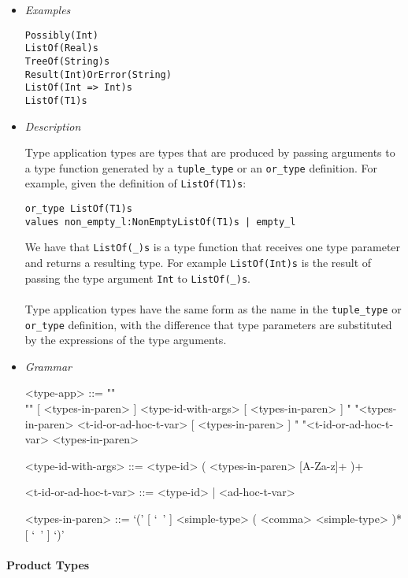 \documentclass{article}
\begin{document}
\begin{itemize}
\item \textit{Examples}
\begin{verbatim}
Possibly(Int)
ListOf(Real)s
TreeOf(String)s 
Result(Int)OrError(String)
ListOf(Int => Int)s
ListOf(T1)s
\end{verbatim}

\item \textit{Description}

Type application types are types that are produced by passing arguments
to a type function generated by a \texttt{tuple_type} or an \texttt{or_type}
definition. For example, given the definition of \texttt{ListOf(T1)s}:
\begin{verbatim}
or_type ListOf(T1)s
values non_empty_l:NonEmptyListOf(T1)s | empty_l
\end{verbatim}
We have that \texttt{ListOf(_)s} is a type function that receives one type
parameter and returns a resulting type. For example \texttt{ListOf(Int)s} is
the result of passing the type argument \texttt{Int} to \texttt{ListOf(_)s}.
\\\\
Type application types have the same form as the name in the
\texttt{tuple_type} or \texttt{or_type} definition, with the difference that
type parameters are substituted by the expressions of the type arguments.

\item \textit{Grammar}
\begin{grammar}
<type-app> ::= ""\\""
[ <types-in-paren> ] <type-id-with-args> [ <types-in-paren> ]
\alt " "<types-in-paren> <t-id-or-ad-hoc-t-var> [ <types-in-paren> ]
\alt " "<t-id-or-ad-hoc-t-var> <types-in-paren>

<type-id-with-args> ::= <type-id> ( <types-in-paren> [A-Za-z]+ )+

<t-id-or-ad-hoc-t-var> ::= <type-id> | <ad-hoc-t-var>

<types-in-paren> ::=
`(' [ `\ ' ] <simple-type> ( <comma> <simple-type> )* [ `\ ' ] `)'
\end{grammar}
\end{itemize}

\newpage

\paragraph{Product Types}
\end{document}

